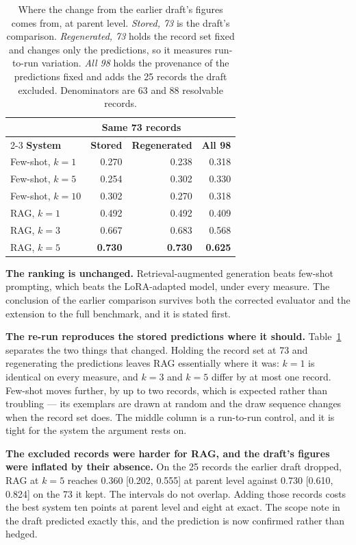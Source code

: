 \begin{table}[htbp]
  \centering
  \caption{Where the change from the earlier draft's figures comes from, at
  parent level. \emph{Stored, 73} is the draft's comparison. \emph{Regenerated,
  73} holds the record set fixed and changes only the predictions, so it measures
  run-to-run variation. \emph{All 98} holds the provenance of the predictions
  fixed and adds the 25 records the draft excluded. Denominators are 63 and 88
  resolvable records.}
  \label{tab:baseline-decomposition}
  \small
  \begin{tabular}{lrrr}
    \toprule
    & \multicolumn{2}{c}{\textbf{Same 73 records}} & \\
    \cmidrule(lr){2-3}
    \textbf{System} & \textbf{Stored} & \textbf{Regenerated} & \textbf{All 98} \\
    \midrule
    Few-shot, $k=1$ & 0.270 & 0.238 & 0.318 \\
    Few-shot, $k=5$ & 0.254 & 0.302 & 0.330 \\
    Few-shot, $k=10$ & 0.302 & 0.270 & 0.318 \\
    RAG, $k=1$ & 0.492 & 0.492 & 0.409 \\
    RAG, $k=3$ & 0.667 & 0.683 & 0.568 \\
    RAG, $k=5$ & \textbf{0.730} & \textbf{0.730} & \textbf{0.625} \\
    \bottomrule
  \end{tabular}
\end{table}

\textbf{The ranking is unchanged.} Retrieval-augmented generation beats few-shot
prompting, which beats the LoRA-adapted model, under every measure. The conclusion
of the earlier comparison survives both the corrected evaluator and the extension
to the full benchmark, and it is stated first.

\textbf{The re-run reproduces the stored predictions where it should.}
Table~\ref{tab:baseline-decomposition} separates the two things that changed.
Holding the record set at 73 and regenerating the predictions leaves RAG
essentially where it was: $k=1$ is identical on every measure, and $k=3$ and
$k=5$ differ by at most one record. Few-shot moves further, by up to two records,
which is expected rather than troubling --- its exemplars are drawn at random and
the draw sequence changes when the record set does. The middle column is a
run-to-run control, and it is tight for the system the argument rests on.

\textbf{The excluded records were harder for RAG, and the draft's figures were
inflated by their absence.} On the 25 records the earlier draft dropped, RAG at
$k=5$ reaches 0.360 [0.202, 0.555] at parent level against 0.730 [0.610, 0.824]
on the 73 it kept. The intervals do not overlap. Adding those records costs the
best system ten points at parent level and eight at exact. The scope note in the
draft predicted exactly this, and the prediction is now confirmed rather than
hedged.

